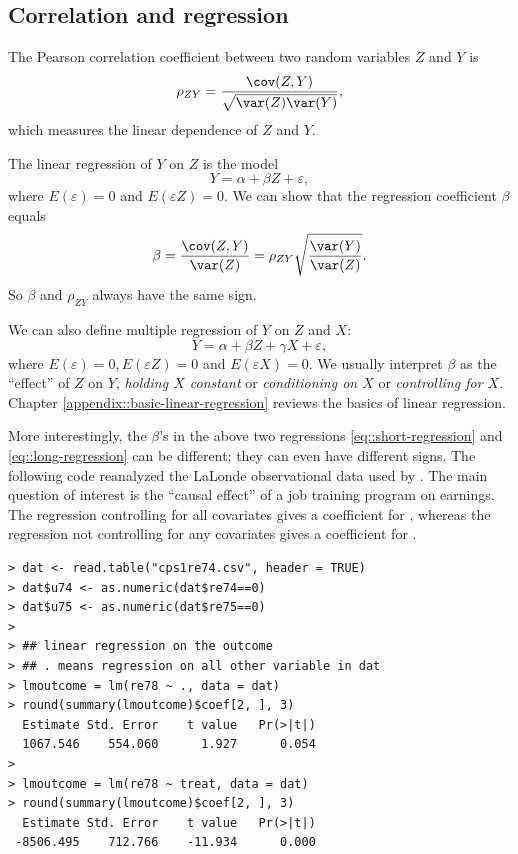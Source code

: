 \subsection{Correlation and regression}
\label{section:correlatioandregressionintro}

The Pearson correlation coefficient between two random variables $Z$ and $Y$ is
$$
\rho_{ZY} = \frac{  \cov(Z, Y)   }{   \sqrt{   \var(Z) \var(Y)   }   } ,
$$
which measures the linear dependence of $Z$ and $Y.$
 

The linear regression of $Y$ on $Z$ is the model 
\begin{equation}
Y = \alpha + \beta Z + \varepsilon ,
\label{eq::short-regression}
\end{equation} 
 where $E(   \varepsilon  ) = 0$ and $E(   \varepsilon  Z ) = 0 $. We can show that the regression coefficient $\beta$ equals  
 $$
 \beta = \frac{  \cov(Z, Y)   }{   \var(Z)    }  = \rho_{ZY}   \sqrt{     \frac{  \var(Y)     }{ \var(Z)  }    }  . 
 $$
 So $\beta$ and $\rho_{ZY} $ always have the same sign. 
 
 
We can also define multiple regression of $Y$ on $Z$ and $X$: 
\begin{equation}
 Y = \alpha  + \beta Z + \gamma  X + \varepsilon ,
 \label{eq::long-regression}
\end{equation}
 where $E( \varepsilon) = 0, E( \varepsilon Z) = 0$ and $ E( \varepsilon X) = 0$. 
We usually interpret $\beta$ as the ``effect'' of $Z$ on $Y$, {\it holding $X$ constant} or {\it conditioning on $X$} or {\it controlling for $X$}. Chapter \ref{appendix::basic-linear-regression} reviews the basics of linear regression. 

 

More interestingly, the $\beta$'s in the above two regressions \eqref{eq::short-regression} and \eqref{eq::long-regression} can be different; they can even have different signs. The following  code reanalyzed the LaLonde observational data used by \citet{hainmueller2012entropy}. The main question of interest is the ``causal effect'' of a job training program on earnings. The regression controlling for all covariates gives a  coefficient  for , whereas the regression not controlling for any covariates gives a coefficient  for . 


\begin{lstlisting}
> dat <- read.table("cps1re74.csv", header = TRUE)
> dat$u74 <- as.numeric(dat$re74==0)
> dat$u75 <- as.numeric(dat$re75==0)
> 
> ## linear regression on the outcome
> ## . means regression on all other variable in dat
> lmoutcome = lm(re78 ~ ., data = dat)
> round(summary(lmoutcome)$coef[2, ], 3)
  Estimate Std. Error    t value   Pr(>|t|) 
  1067.546    554.060      1.927      0.054 
> 
> lmoutcome = lm(re78 ~ treat, data = dat)
> round(summary(lmoutcome)$coef[2, ], 3)
  Estimate Std. Error    t value   Pr(>|t|) 
 -8506.495    712.766    -11.934      0.000 
\end{lstlisting} 



